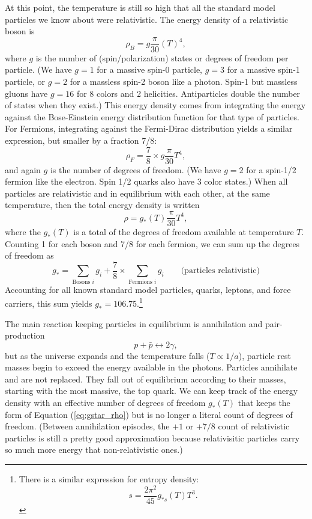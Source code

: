 At this point, the temperature is still so high that all the standard model particles we know about were relativistic.  The energy density of a relativistic boson is 
\begin{equation}
 \rho_B =  g \frac{\pi}{30}  (T)^4,
\end{equation}
where $g$ is the number of (spin/polarization) states or degrees of freedom per particle. (We have $g=1$ for a massive spin-0 particle, $g=3$ for a massive spin-1 particle, or $g=2$ for a massless spin-2 boson like a photon.  Spin-1 but massless gluons have $g=16$ for 8 colors and 2 helicities.  Antiparticles double the number of states when they exist.)  This energy density comes from integrating the energy against the Bose-Einstein energy distribution function for that type of particles.  For Fermions, integrating against the Fermi-Dirac distribution yields a similar expression, but smaller by a fraction 7/8:
\begin{equation}
 \rho_F = \frac{7}{8} \times  g \frac{\pi}{30}  T^4,
\end{equation}
and again $g$ is the number of degrees of freedom. (We have $g=2$ for a spin-1/2 fermion like the electron. Spin 1/2 quarks also have 3 color states.)  When all particles are relativistic and in equilibrium with each other, at the same temperature, then the total energy density is written
\begin{equation}
 \rho =  g_*(T) \frac{\pi}{30}  T^4, \label{eq:gstar_rho}
\end{equation}
where the $g_*(T)$ is a total of the degrees of freedom available at temperature $T$.  Counting 1 for each boson and 7/8 for each fermion, we can sum up the degrees of freedom as
\begin{equation}
  g_* = \sum_{\textrm{Bosons }i} g_i + \frac{7}{8}\times \sum_{\textrm{Fermions }i} g_i \qquad \textrm{(particles relativistic)}
\end{equation}
Accounting for all known standard model particles, quarks, leptons, and force carriers, this sum yields $g_* = 106.75$.\footnote{
There is a similar expression for entropy density:\begin{equation}
 s = \frac{2\pi^2}{45} g_{*s}(T) T^3.
\end{equation}
}

The main reaction keeping particles in equilibrium is annihilation and pair-production
\begin{equation}
  p + \bar p \leftrightarrow 2 \gamma,
\end{equation}
but as the universe expands and the temperature falls ($T\propto 1/a$), particle rest masses begin to exceed the energy available in the photons.  Particles annihilate and are not replaced.  They fall out of equilibrium according to their masses, starting with the most massive, the top quark.  We can keep track of the energy density with an effective number of degrees of freedom $g_*(T)$ that keeps the form of Equation (\ref{eq:gstar_rho}) but is no longer a literal count of degrees of freedom.  (Between annihilation episodes, the $+1$ or $+7/8$ count of relativistic particles is still a pretty good approximation because relativisitic particles carry so much more energy that non-relativistic ones.)  

